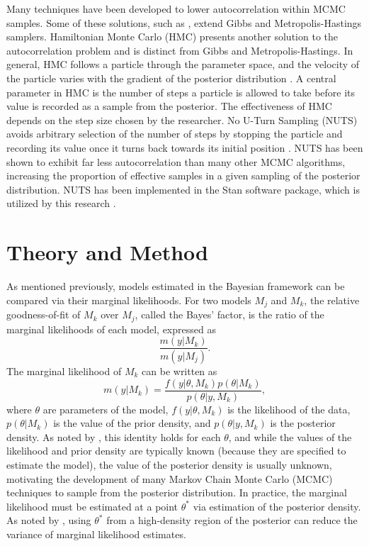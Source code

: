 \documentclass[twocolumn]{article}
\begin{document}
Many techniques have been developed to lower autocorrelation within MCMC samples. Some of these solutions, such as \cite{Gilks}, extend Gibbs and Metropolis-Hastings samplers. Hamiltonian Monte Carlo (HMC) presents another solution to the autocorrelation problem and is distinct from Gibbs and Metropolis-Hastings. In general, HMC follows a particle through the parameter space, and the velocity of the particle varies with the gradient of the posterior distribution \citep{Girolami}. A central parameter in HMC is the number of steps a particle is allowed to take before its value is recorded as a sample from the posterior. The effectiveness of HMC depends on the step size chosen by the researcher. No U-Turn Sampling (NUTS) avoids arbitrary selection of the number of steps by stopping the particle and recording its value once it turns back towards its initial position \citep{NUTS}. NUTS has been shown to exhibit far less autocorrelation than many other MCMC algorithms, increasing the proportion of effective samples in a given sampling of the posterior distribution. NUTS has been implemented in the Stan software package, which is utilized by this research \citep{rstan}.

\section{Theory and Method}
\label{sec:Theory}

As mentioned previously, models estimated in the Bayesian framework can be compared via their marginal likelihoods. For two models $M_j$ and $M_k$, the relative goodness-of-fit of $M_k$ over $M_j$, called the Bayes' factor, is the ratio of the marginal likelihoods of each model, expressed as
\begin{equation}
	\frac{m(y|M_k)}{m(y|M_j)}.
\end{equation}
The marginal likelihood of $M_k$ can be written as
\begin{equation}
	m(y|M_k) = \frac{f(y|\theta, M_k)p(\theta|M_k)}{p(\theta|y, M_k)},
\end{equation}
where $\theta$ are parameters of the model, $f(y|\theta, M_k)$ is the likelihood of the data, $p(\theta|M_k)$ is the value of the prior density, and $p(\theta|y, M_k)$ is the posterior density. As noted by \cite{Chib}, this identity holds for each $\theta$, and while the values of the likelihood and prior density are typically known (because they are specified to estimate the model), the value of the posterior density is usually unknown, motivating the development of many Markov Chain Monte Carlo (MCMC) techniques to sample from the posterior distribution. In practice, the marginal likelihood must be estimated at a point $\theta^*$ via estimation of the posterior density. As noted by \cite{Chib}, using $\theta^*$ from a high-density region of the posterior can reduce the variance of marginal likelihood estimates.
\end{document}
